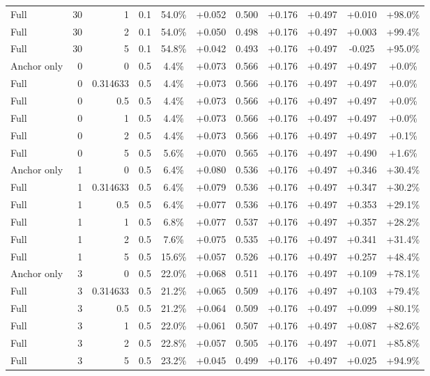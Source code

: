 \begin{table}[htbp]
\begin{tabular}{lrrrccccccc}
Full & 30 & 1 & 0.1 & 54.0\% & +0.052 & 0.500 & +0.176 & +0.497 & +0.010 & +98.0\% \\
Full & 30 & 2 & 0.1 & 54.0\% & +0.050 & 0.498 & +0.176 & +0.497 & +0.003 & +99.4\% \\
Full & 30 & 5 & 0.1 & 54.8\% & +0.042 & 0.493 & +0.176 & +0.497 & -0.025 & +95.0\% \\
Anchor only & 0 & 0 & 0.5 & 4.4\% & +0.073 & 0.566 & +0.176 & +0.497 & +0.497 & +0.0\% \\
Full & 0 & 0.314633 & 0.5 & 4.4\% & +0.073 & 0.566 & +0.176 & +0.497 & +0.497 & +0.0\% \\
Full & 0 & 0.5 & 0.5 & 4.4\% & +0.073 & 0.566 & +0.176 & +0.497 & +0.497 & +0.0\% \\
Full & 0 & 1 & 0.5 & 4.4\% & +0.073 & 0.566 & +0.176 & +0.497 & +0.497 & +0.0\% \\
Full & 0 & 2 & 0.5 & 4.4\% & +0.073 & 0.566 & +0.176 & +0.497 & +0.497 & +0.1\% \\
Full & 0 & 5 & 0.5 & 5.6\% & +0.070 & 0.565 & +0.176 & +0.497 & +0.490 & +1.6\% \\
Anchor only & 1 & 0 & 0.5 & 6.4\% & +0.080 & 0.536 & +0.176 & +0.497 & +0.346 & +30.4\% \\
Full & 1 & 0.314633 & 0.5 & 6.4\% & +0.079 & 0.536 & +0.176 & +0.497 & +0.347 & +30.2\% \\
Full & 1 & 0.5 & 0.5 & 6.4\% & +0.077 & 0.536 & +0.176 & +0.497 & +0.353 & +29.1\% \\
Full & 1 & 1 & 0.5 & 6.8\% & +0.077 & 0.537 & +0.176 & +0.497 & +0.357 & +28.2\% \\
Full & 1 & 2 & 0.5 & 7.6\% & +0.075 & 0.535 & +0.176 & +0.497 & +0.341 & +31.4\% \\
Full & 1 & 5 & 0.5 & 15.6\% & +0.057 & 0.526 & +0.176 & +0.497 & +0.257 & +48.4\% \\
Anchor only & 3 & 0 & 0.5 & 22.0\% & +0.068 & 0.511 & +0.176 & +0.497 & +0.109 & +78.1\% \\
Full & 3 & 0.314633 & 0.5 & 21.2\% & +0.065 & 0.509 & +0.176 & +0.497 & +0.103 & +79.4\% \\
Full & 3 & 0.5 & 0.5 & 21.2\% & +0.064 & 0.509 & +0.176 & +0.497 & +0.099 & +80.1\% \\
Full & 3 & 1 & 0.5 & 22.0\% & +0.061 & 0.507 & +0.176 & +0.497 & +0.087 & +82.6\% \\
Full & 3 & 2 & 0.5 & 22.8\% & +0.057 & 0.505 & +0.176 & +0.497 & +0.071 & +85.8\% \\
Full & 3 & 5 & 0.5 & 23.2\% & +0.045 & 0.499 & +0.176 & +0.497 & +0.025 & +94.9\% \\

\end{tabular}
\end{table}
